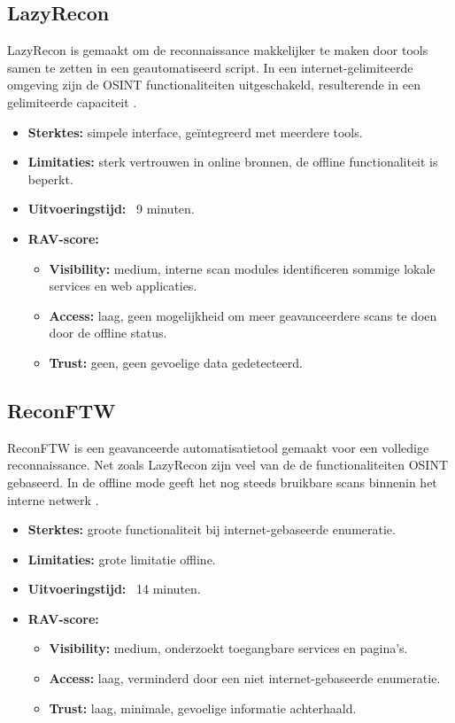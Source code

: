 \subsection{LazyRecon}
LazyRecon is gemaakt om de reconnaissance makkelijker te maken door tools samen te zetten in een geautomatiseerd script. 
In een internet-gelimiteerde omgeving zijn de OSINT functionaliteiten uitgeschakeld, resulterende in een gelimiteerde capaciteit \autocite{lazyrecon}.

\begin{itemize}
  \item \textbf{Sterktes:} simpele interface, geïntegreerd met meerdere tools.
  \item \textbf{Limitaties:} sterk vertrouwen in online bronnen, de offline functionaliteit is beperkt. 
  \item \textbf{Uitvoeringstijd:} ~9 minuten.
  \item \textbf{RAV-score:}
    \small{
    \begin{itemize}
      \item \textbf{Visibility:} medium, interne scan modules identificeren sommige lokale services en web applicaties.
      \item \textbf{Access:} laag, geen mogelijkheid om meer geavanceerdere scans te doen door de offline status.
      \item \textbf{Trust:} geen, geen gevoelige data gedetecteerd. 
    \end{itemize}
    }
\end{itemize}

\subsection{ReconFTW}

ReconFTW is een geavanceerde automatisatietool gemaakt voor een volledige reconnaissance. Net zoals LazyRecon zijn veel van de de functionaliteiten OSINT gebaseerd. 
In de offline mode geeft het nog steeds bruikbare scans binnenin het interne netwerk \autocite{reconftw}.

\begin{itemize}
  \item \textbf{Sterktes:} groote functionaliteit bij internet-gebaseerde enumeratie.
  \item \textbf{Limitaties:} grote limitatie offline.
  \item \textbf{Uitvoeringstijd:} ~14 minuten.
  \item \textbf{RAV-score:} 
    \small{
    \begin{itemize}
      \item \textbf{Visibility:} medium, onderzoekt toegangbare services en pagina's.
      \item \textbf{Access:} laag, verminderd door een niet internet-gebaseerde enumeratie.
      \item \textbf{Trust:} laag, minimale, gevoelige informatie achterhaald. 
    \end{itemize}
    }
\end{itemize}


